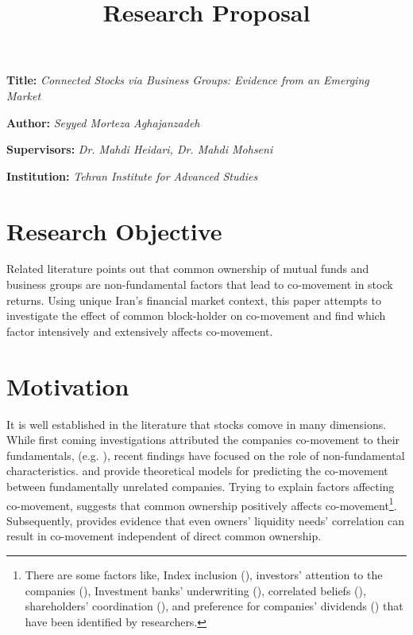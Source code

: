\documentclass[12pt, a4paper]{article}
\title{\textbf{Research Proposal}}
\author{}
\date{}
\newcommand{\namelistlabel}[1]{\mbox{#1}\hfil}
\newenvironment{namelist}[1]{%
	\begin{list}{}
		{
			\let\makelabel\namelistlabel
			\settowidth{\labelwidth}{#1}
			\setlength{\leftmargin}{1.1\labelwidth}
		}
	}{%
\end{list}}
\begin{document}
\maketitle
\begin{namelist}{xxxxxxxxxxxx}
	\item[{\bf Title:}]
	\textit{Connected Stocks via Business Groups: Evidence from an Emerging Market }
	\item[{\bf Author:}]
	\textit{ Seyyed Morteza Aghajanzadeh}
	\item[{\bf Supervisors:}]
	\textit{	Dr. Mahdi Heidari, Dr. Mahdi Mohseni}
	\item[{\bf Institution:}]
	\textit{	Tehran Institute for Advanced Studies}
\end{namelist}


\section*{Research Objective}
Related literature points out that common ownership of mutual funds and business groups are non-fundamental factors that lead to co-movement in stock returns. Using unique Iran's financial market context, this paper attempts to investigate the effect of common block-holder on co-movement and find which factor intensively and extensively affects co-movement. 
\section*{Motivation}
	{
	It is well established in the literature that stocks comove in many dimensions. While first coming  investigations   attributed the companies co-movement to their fundamentals, (e.g. {\cite{shiller1989comovements}})}, recent findings have focused on the role of non-fundamental characteristics. {\cite{barberis2003style} and \cite{barberis2005comovement}} provide theoretical models for predicting the co-movement between fundamentally unrelated companies.	Trying to explain factors affecting co-movement, \cite{AntonPolk} suggests that common ownership positively affects co-movement\footnote{There are some factors like, Index inclusion ({\cite{barberis2005comovement}}), investors' attention to the companies ({\cite{wu2014investor}}), Investment banks' underwriting ({\cite{grullon2014comovement}}), correlated beliefs ({\cite{david2016correlated}}), shareholders' coordination ({\cite{pantzalis2017shareholder}}), and preference for companies' dividends ({\cite{HAMEED2019103}}) that have been identified by researchers.}.	Subsequently, {\cite{Liquidity2016}} provides evidence that even owners' liquidity needs' correlation can result in co-movement independent of direct common ownership.	
	
\end{document}
